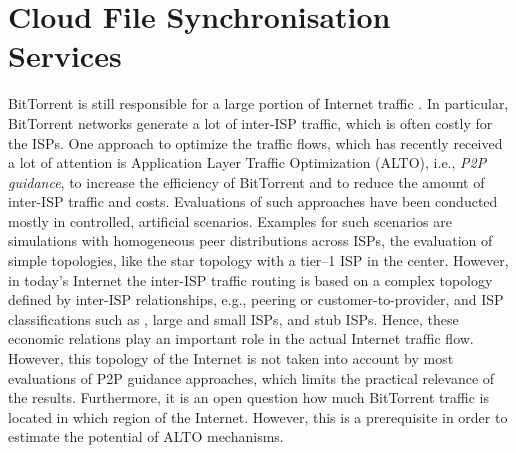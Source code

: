 \section{Cloud File Synchronisation Services}\label{sec:aslevel:p2p}

BitTorrent is still responsible for a large portion of Internet traffic \cite{Cisc09,wamser2010}. In particular, BitTorrent networks generate a lot of inter-ISP traffic, which is often costly for the ISPs. One approach to optimize the traffic flows, which has recently received a lot of attention is Application Layer Traffic Optimization (ALTO), i.e., \textit{P2P guidance}, to increase the efficiency of BitTorrent and to reduce the amount of inter-ISP traffic and costs. Evaluations of such approaches have been conducted mostly in controlled, artificial scenarios. Examples for such scenarios are simulations with homogeneous peer distributions across ISPs, the evaluation of simple topologies, like the star topology with a tier--1 ISP in the center. However, in today's Internet the inter-ISP traffic routing is based on a complex topology defined by inter-ISP relationships, e.g., peering or customer-to-provider, and ISP classifications such as \tier, large and small ISPs, and stub ISPs. Hence, these economic relations play an important role in the actual Internet traffic flow. However, this topology of the Internet is not taken into account by most evaluations of P2P guidance approaches, which limits the practical relevance of the results. Furthermore, it is an open question how much BitTorrent traffic is located in which region of the Internet. However, this is a prerequisite in order to estimate the potential of ALTO mechanisms.

